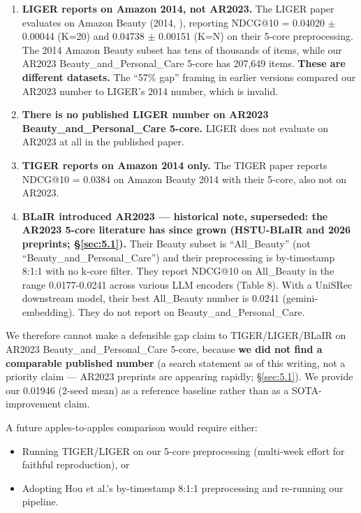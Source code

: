 \begin{enumerate}
\def\labelenumi{\arabic{enumi}.}
\item
  \textbf{LIGER reports on Amazon 2014, not AR2023.} The LIGER paper \citep{yang2024liger} evaluates on Amazon Beauty (2014, \citealp{he2016ups}), reporting NDCG@10 = 0.04020 \ensuremath{\pm} 0.00044 (K=20) and 0.04738 \ensuremath{\pm} 0.00151 (K=N) on their 5-core preprocessing. The 2014 Amazon Beauty subset has tens of thousands of items, while our AR2023 Beauty\_and\_\allowbreak Personal\_Care 5-core has 207,649 items. \textbf{These are different datasets.} The ``57\% gap'' framing in earlier versions compared our AR2023 number to LIGER's 2014 number, which is invalid.
\item
  \textbf{There is no published LIGER number on AR2023 Beauty\_and\_\allowbreak Personal\_Care 5-core.} LIGER does not evaluate on AR2023 at all in the published paper.
\item
  \textbf{TIGER reports on Amazon 2014 only.} The TIGER paper \citep{rajput2023tiger} reports NDCG@10 = 0.0384 on Amazon Beauty 2014 with their 5-core, also not on AR2023.
\item
  \textbf{BLaIR \citep{hou2024blair} introduced AR2023 --- historical note, superseded: the AR2023 5-core literature has since grown (HSTU-BLaIR and 2026 preprints; \S\ref{sec:5.1}).} Their Beauty subset is ``All\_Beauty'' (not ``Beauty\_and\_\allowbreak Personal\_Care'') and their preprocessing is by-timestamp 8:1:1 with no k-core filter. They report NDCG@10 on All\_Beauty in the range 0.0177-0.0241 across various LLM encoders (Table 8). With a UniSRec downstream model, their best All\_Beauty number is 0.0241 (gemini-embedding). They do not report on Beauty\_and\_\allowbreak Personal\_Care.
\end{enumerate}

We therefore cannot make a defensible gap claim to TIGER/LIGER/BLaIR on AR2023 Beauty\_and\_\allowbreak Personal\_Care 5-core, because \textbf{we did not find a comparable published number} (a search statement as of this writing, not a priority claim --- AR2023 preprints are appearing rapidly; \S\ref{sec:5.1}). We provide our 0.01946 (2-seed mean) as a reference baseline rather than as a SOTA-improvement claim.

A future apples-to-apples comparison would require either:

\begin{itemize}
\tightlist
\item
  Running TIGER/LIGER on our 5-core preprocessing (multi-week effort for faithful reproduction), or
\item
  Adopting Hou et al.'s by-timestamp 8:1:1 preprocessing and re-running our pipeline.
\end{itemize}

